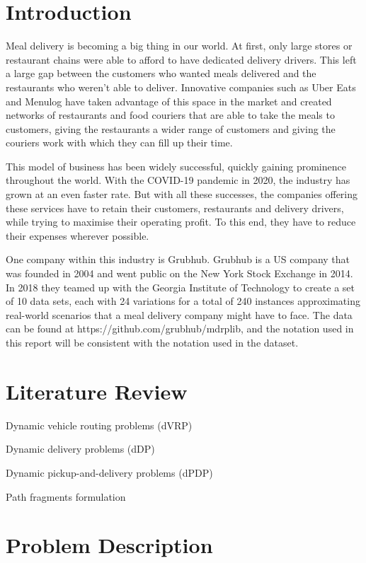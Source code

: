 \documentclass{article}
\begin{document}
\tableofcontents{}

\section{Introduction}

Meal delivery is becoming a big thing in our world. At first, only large stores or restaurant chains were able to afford to have dedicated delivery drivers. This left a large gap between the customers who wanted meals delivered and the restaurants who weren't able to deliver. Innovative companies such as Uber Eats and Menulog have taken advantage of this space in the market and created networks of restaurants and food couriers that are able to take the meals to customers, giving the restaurants a wider range of customers and giving the couriers work with which they can fill up their time.

This model of business has been widely successful, quickly gaining prominence throughout the world. With the COVID-19 pandemic in 2020, the industry has grown at an even faster rate. But with all these successes, the companies offering these services have to retain their customers, restaurants and delivery drivers, while trying to maximise their operating profit. To this end, they have to reduce their expenses wherever possible.

One company within this industry is Grubhub. Grubhub is a US company that was founded in 2004 and went public on the New York Stock Exchange in 2014. In 2018 they teamed up with the Georgia Institute of Technology to create a set of 10 data sets, each with 24 variations for a total of 240 instances approximating real-world scenarios that a meal delivery company might have to face. The data can be found at https://github.com/grubhub/mdrplib, and the notation used in this report will be consistent with the notation used in the dataset.

\section{Literature Review}

Dynamic vehicle routing problems (dVRP)

Dynamic delivery problems (dDP)

Dynamic pickup-and-delivery problems (dPDP)

Path fragments formulation

\section{Problem Description}
\end{document}
